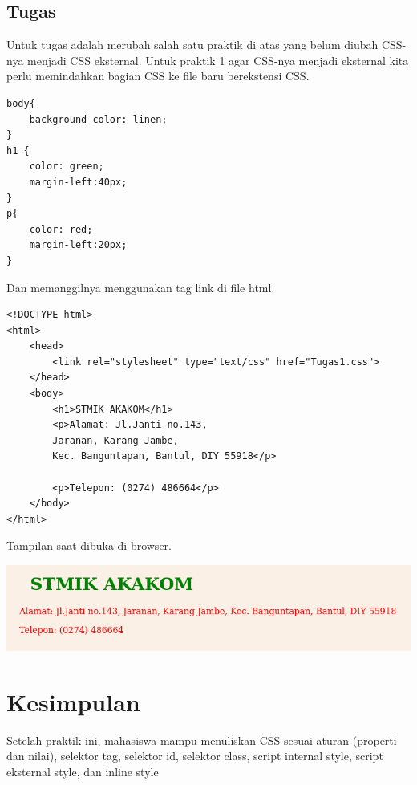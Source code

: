 \documentclass[a4paper,12pt]{article}
\begin{document}
\newpage

\subsection{Tugas}
Untuk tugas adalah merubah salah satu praktik di atas yang belum diubah CSS-nya menjadi CSS eksternal. Untuk praktik 1 agar CSS-nya menjadi eksternal kita perlu memindahkan bagian CSS ke file 
baru berekstensi CSS.
\begin{lstlisting}
body{
    background-color: linen;
}
h1 {
    color: green;
    margin-left:40px;
}
p{
    color: red;
    margin-left:20px;
}
\end{lstlisting}
Dan memanggilnya menggunakan tag link di file html.
\begin{lstlisting}
<!DOCTYPE html>
<html>
    <head>
        <link rel="stylesheet" type="text/css" href="Tugas1.css">
    </head>
    <body>
        <h1>STMIK AKAKOM</h1>
        <p>Alamat: Jl.Janti no.143, 
        Jaranan, Karang Jambe, 
        Kec. Banguntapan, Bantul, DIY 55918</p>

        <p>Telepon: (0274) 486664</p>
    </body>
</html>
\end{lstlisting}
Tampilan saat dibuka di browser.
\begin{center}
    \includegraphics[width=\linewidth]{1.png}
\end{center}

\newpage
\section{Kesimpulan}
Setelah praktik ini, mahasiswa mampu menuliskan CSS sesuai aturan (properti dan nilai), selektor tag, selektor id, selektor class, script internal style, script eksternal style, dan inline style
\end{document}
